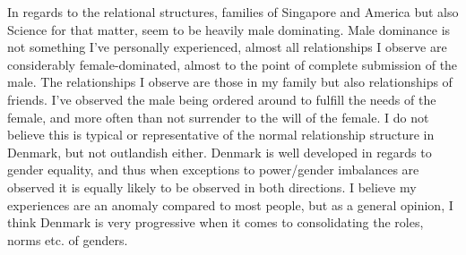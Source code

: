 In regards to the relational structures, families of Singapore and America but also Science for that matter, seem to be heavily male dominating.
Male dominance is not something I've personally experienced, almost all relationships I observe are considerably female-dominated, almost to the point of complete submission of the male.
The relationships I observe are those in my family but also relationships of friends.
I've observed the male being ordered around to fulfill the needs of the female, and more often than not surrender to the will of the female.
I do not believe this is typical or representative of the normal relationship structure in Denmark, but not outlandish either.
Denmark is well developed in regards to gender equality, and thus when exceptions to power/gender imbalances are observed it is equally likely to be observed in both directions.
I believe my experiences are an anomaly compared to most people, but as a general opinion, I think Denmark is very progressive when it comes to consolidating the roles, norms etc. of genders.